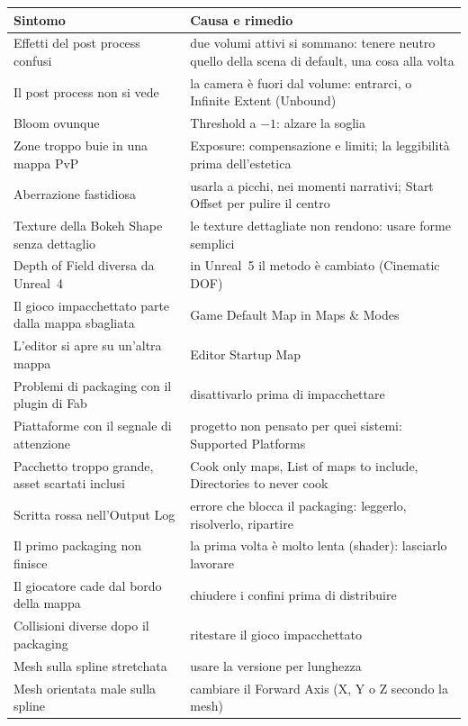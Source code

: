 \begin{table}[htbp]
\centering
\small
\begin{tabular}{@{}p{5.4cm}p{8.6cm}@{}}
\toprule
\textbf{Sintomo} & \textbf{Causa e rimedio} \\
\midrule
Effetti del post process confusi & due volumi attivi si sommano: tenere neutro quello della
scena di default, una cosa alla volta \\
Il post process non si vede & la camera è fuori dal volume: entrarci, o Infinite Extent
(Unbound) \\
Bloom ovunque & Threshold a $-1$: alzare la soglia \\
Zone troppo buie in una mappa PvP & Exposure: compensazione e limiti; la leggibilità prima
dell'estetica \\
Aberrazione fastidiosa & usarla a picchi, nei momenti narrativi; Start Offset per pulire il
centro \\
Texture della Bokeh Shape senza dettaglio & le texture dettagliate non rendono: usare forme
semplici \\
Depth of Field diversa da Unreal~4 & in Unreal~5 il metodo è cambiato (Cinematic DOF) \\
Il gioco impacchettato parte dalla mappa sbagliata & Game Default Map in Maps \& Modes \\
L'editor si apre su un'altra mappa & Editor Startup Map \\
Problemi di packaging con il plugin di Fab & disattivarlo prima di impacchettare \\
Piattaforme con il segnale di attenzione & progetto non pensato per quei sistemi: Supported
Platforms \\
Pacchetto troppo grande, asset scartati inclusi & Cook only maps, List of maps to include,
Directories to never cook \\
Scritta rossa nell'Output Log & errore che blocca il packaging: leggerlo, risolverlo,
ripartire \\
Il primo packaging non finisce & la prima volta è molto lenta (shader): lasciarlo lavorare \\
Il giocatore cade dal bordo della mappa & chiudere i confini prima di distribuire \\
Collisioni diverse dopo il packaging & ritestare il gioco impacchettato \\
Mesh sulla spline stretchata & usare la versione per lunghezza \\
Mesh orientata male sulla spline & cambiare il Forward Axis (X, Y o Z secondo la mesh) \\

\end{tabular}
\end{table}
